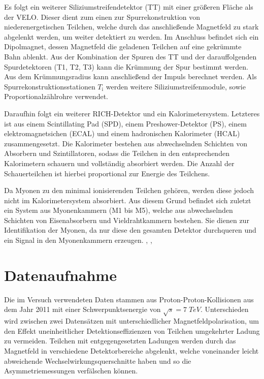 Es folgt ein weiterer Siliziumstreifendetektor (TT) mit einer größeren Fläche als der VELO. Dieser dient zum einen zur Spurrekonstruktion von niederenergetischen Teilchen, welche durch das anschließende Magnetfeld zu stark abgelenkt werden, um weiter detektiert zu werden. Im Anschluss befindet sich ein Dipolmagnet, dessen Magnetfeld die geladenen Teilchen auf eine gekrümmte Bahn ablenkt. Aus der Kombination der Spuren des TT und der darauffolgenden Spurdetektoren (T1, T2, T3) kann die Krümmung der Spur bestimmt werden.
Aus dem Krümmungsradius kann anschließend der Impuls berechnet werden. Als Spurrekonstruktionsstationen $T_{\mathrm{i}}$ werden weitere Siliziumstreifenmodule, sowie Proportionalzählrohre verwendet.

Daraufhin folgt ein weiterer RICH-Detektor und ein Kalorimetersystem. Letzteres ist aus einem Scintillating Pad (SPD), einem Preshower-Detektor (PS), einem elektromagnetsichen (ECAL) und einem hadronischen Kalorimeter (HCAL) zusammengesetzt. Die Kalorimeter bestehen aus abwechselnden Schichten von Absorbern und Szintillatoren, sodass die Teilchen in den entsprechenden Kalorimetern schauern und vollständig absorbiert werden. Die Anzahl der Schauerteilchen ist hierbei proportional zur Energie des Teilchens.

Da Myonen zu den minimal ionisierenden Teilchen gehören, werden diese jedoch nicht im Kalorimetersystem absorbiert. Aus diesem Grund befindet sich zuletzt ein System aus Myonenkammern (M1 bis M5), welche aus abwechselnden Schichten von Eisenabsorbern und Vieldrahtkammern bestehen. Sie dienen zur Identifikation der Myonen, da nur diese den gesamten Detektor durchqueren und ein Signal in den Myonenkammern erzeugen. \cite{lhcb}, \cite{lhcbpaper}, \cite{lhcbmachine}

\section{Datenaufnahme}
Die im Versuch verwendeten Daten stammen aus Proton-Proton-Kollisionen aus dem Jahr 2011 mit einer Schwerpunktsenergie von $\sqrt{s}=7\;\si{TeV}$. Unterschieden wird zwischen zwei Datensätzen mit unterschiedlicher Magnetfeldpolarisation, um den Effekt uneinheitlicher Detektionseffizienzen von Teilchen umgekehrter Ladung zu vermeiden. Teilchen mit entgegengesetzten Ladungen werden durch das Magnetfeld in verschiedene Detektorbereiche abgelenkt, welche voneinander leicht abweichende Wechselwirkungsquerschnitte haben und so die Asymmetriemessungen verfälschen können.

